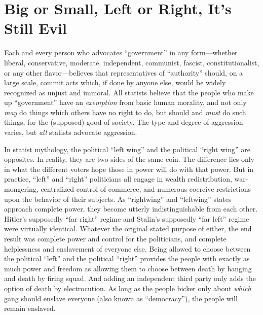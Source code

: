 \documentclass{book}
\begin{document}
\section{Big or Small, Left or Right, It's Still Evil}

Each and every person who advocates \enquote{government} in any form---whether liberal, conservative, moderate, independent, communist, fascist, constitutionalist, or any other flavor---believes that representatives of \enquote{authority} should, on a large scale, commit acts which, if done by anyone else, would be widely recognized as unjust and immoral. All statists believe that the people who make up \enquote{government} have an \emph{exemption} from basic human morality, and not only \emph{may} do things which others have no right to do, but should and \emph{must} do such things, for the (supposed) good of society. The type and degree of aggression varies, but \emph{all} statists advocate aggression.

In statist mythology, the political \enquote{left wing} and the political \enquote{right wing} are opposites. In reality, they are two sides of the same coin. The difference lies only in what the different voters hope those in power will do with that power. But in practice, \enquote{left} and \enquote{right} politicians all engage in wealth redistribution, war-mongering, centralized control of commerce, and numerous coercive restrictions upon the behavior of their subjects. As \enquote{rightwing} and \enquote{leftwing} states approach complete power, they become utterly indistinguishable from each other. Hitler's supposedly \enquote{far right} regime and Stalin's supposedly \enquote{far left} regime were virtually identical. Whatever the original stated purpose of either, the end result was complete power and control for the politicians, and complete helplessness and enslavement of everyone else. Being allowed to choose between the political \enquote{left} and the political \enquote{right} provides the people with exactly as much power and freedom as allowing them to choose between death by hanging and death by firing squad. And adding an independent third party only adds the option of death by electrocution. As long as the people bicker only about \emph{which} gang should enslave everyone (also known as \enquote{democracy}), the people will remain enslaved.
\end{document}
